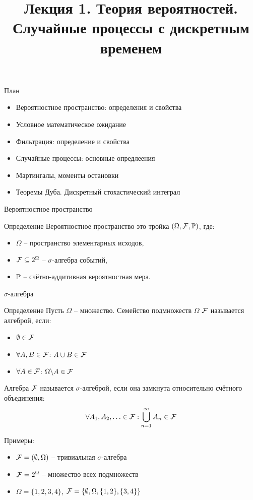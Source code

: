 \documentclass{beamer}
\title[Случайные процессы]{Лекция 1. Теория вероятностей. Случайные процессы с дискретным временем} %
\begin{document}
\begin{frame}
\titlepage 
\end{frame}

\begin{frame}{План}
    \begin{itemize}
        \item Вероятностное пространство: определения и свойства
        \item Условное математическое ожидание
        \item Фильтрация: определение и свойства
        \item Случайные процессы: основные опредлеения
        \item Мартингалы, моменты остановки
        \item Теоремы Дуба. Дискретный стохастический интеграл
    \end{itemize}
\end{frame}

\begin{frame}{Вероятностное пространство}
    \begin{block}{Определение}
        Вероятностное пространство это тройка $(\Omega, \mathcal{F}, \mathbb{P})$, где:
        \begin{itemize}
            \item $\Omega$ -- пространство элементарных исходов,
            \item $\mathcal{F} \subseteq 2^{\Omega}$ -- $\sigma$-алгебра событий,
            \item $\mathbb{P}$ -- счётно-аддитивная вероятностная мера.
        \end{itemize}
    \end{block}    
\end{frame}

\begin{frame}{$\sigma$-алгебра}
    \begin{block}{Определение}
        Пусть $\Omega$ -- множество. Семейство подмножеств $\Omega$ $\mathcal{F}$ называется алгеброй, если:
        \begin{itemize}
            \item $\emptyset \in \mathcal{F}$
            \item $\forall A, B \in \mathcal{F}$: $A\cup B\in \mathcal{F}$
            \item $\forall A \in \mathcal{F}$: $\Omega\backslash A \in \mathcal{F}$
        \end{itemize}
    \end{block}
    Алгебра $\mathcal{F}$ называется $\sigma$-алгеброй, если она замкнута относительно счётного объединения: 
    $$\forall A_1, A_2, \ldots \in \mathcal{F}: \bigcup_{n=1}^{\infty} A_n \in \mathcal{F}$$

    Примеры:
    \begin{itemize}
        \item $\mathcal{F}=(\emptyset, \Omega)$ -- тривиальная $\sigma$-алгебра
        \item $\mathcal{F}=2^{\Omega}$ -- множество всех подмножеств
        \item $\Omega = \{1,2,3,4\}$, $\mathcal{F}=\{ \emptyset, \Omega, \{1, 2\}, \{3, 4\} \}$
    \end{itemize}
\end{frame}
\end{document}
